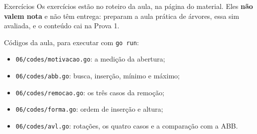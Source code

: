 \documentclass{beamer}
\begin{document}
\begin{frame}{Exercícios}
  Os exercícios estão no roteiro da aula, na página do material. Eles
  \textbf{não valem nota} e não têm entrega: preparam a aula prática de
  árvores, essa sim avaliada, e o conteúdo cai na Prova 1.

  \vspace{0.4cm}
  Códigos da aula, para executar com \texttt{go run}:

  \begin{itemize}
    \item \texttt{06/codes/motivacao.go}: a medição da abertura;
    \item \texttt{06/codes/abb.go}: busca, inserção, mínimo e máximo;
    \item \texttt{06/codes/remocao.go}: os três casos da remoção;
    \item \texttt{06/codes/forma.go}: ordem de inserção e altura;
    \item \texttt{06/codes/avl.go}: rotações, os quatro casos e a comparação
          com a ABB.
  \end{itemize}
\end{frame}
\end{document}

